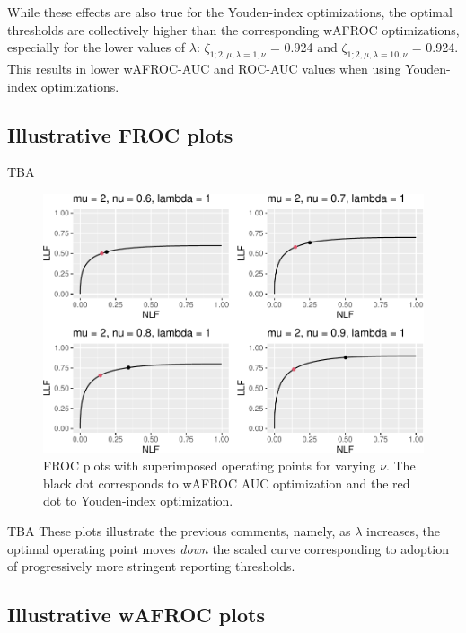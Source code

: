 \documentclass[
]{book}
\begin{document}
While these effects are also true for the Youden-index optimizations, the optimal thresholds are collectively higher than the corresponding wAFROC optimizations, especially for the lower values of \(\lambda\): \(\zeta_{1;2,\mu, \lambda = 1, \nu}\) = 0.924 and \(\zeta_{1;2,\mu, \lambda = 10, \nu}\) = 0.924. This results in lower wAFROC-AUC and ROC-AUC values when using Youden-index optimizations.

\hypertarget{illustrative-froc-plots}{%
\subsection{Illustrative FROC plots}\label{illustrative-froc-plots}}

TBA

\begin{figure}
\centering
\includegraphics{21-optim-op-point_files/figure-latex/optim-op-point-vary-nu-froc-1.pdf}
\caption{\label{fig:optim-op-point-vary-nu-froc}FROC plots with superimposed operating points for varying \(\nu\). The black dot corresponds to wAFROC AUC optimization and the red dot to Youden-index optimization.}
\end{figure}

TBA These plots illustrate the previous comments, namely, as \(\lambda\) increases, the optimal operating point moves \emph{down} the scaled curve corresponding to adoption of progressively more stringent reporting thresholds.

\hypertarget{illustrative-wafroc-plots}{%
\subsection{Illustrative wAFROC plots}\label{illustrative-wafroc-plots}}
\end{document}

